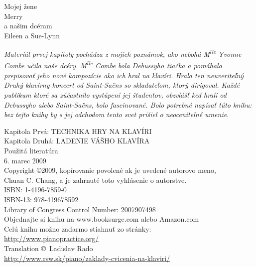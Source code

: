 \begin{center}
Mojej žene\\
\vspace*{1em}
{\large Merry}\\
\vspace*{1em}
a našim dcéram\\
\vspace*{1em}
{\large Eileen a Sue-Lynn}\\	
\vspace*{6em}
\end{center}
\textit{Materiál prvej kapitoly pochádza z mojich poznámok, ako nebohá M\textsuperscript{lle} Yvonne Combe učila naše dcéry. M\textsuperscript{lle} Combe bola Debussyho žiačka a pomáhala prepisovať jeho nové kompozície ako ich hral na klavíri. Hrala ten neuveriteľný Druhý klavírny koncert od Saint-Saëns so skladateľom, ktorý dirigoval. Každé publikum ktoré sa zúčastnilo vystúpení jej študentov, obzvlášť keď hrali od Debussyho alebo Saint-Saëns, bolo fascinované. Bolo potrebné napísať túto knihu: bez tejto knihy by s jej odchodom tento svet prišiel o neoceniteľné umenie.}
\begin{center}
\vspace*{6em}
Kapitola Prvá: TECHNIKA HRY NA KLAVÍRI\\
\vspace*{1em}
Kapitola Druhá: LADENIE VÁŠHO KLAVÍRA\\
\vspace*{1em}
Použitá literatúra\\
\vspace*{10em}
6. marec 2009\\
Copyright \copyright 2009, kopírovanie povolené ak je uvedené autorovo meno,\\
Chuan C. Chang, a je zahrnuté toto vyhlásenie o autorstve.\\
ISBN: 1-4196-7859-0\\
ISBN-13: 978-419678592\\
Library of Congress Control Number: 2007907498\\
Objednajte si knihu na www.booksurge.com alebo Amazon.com\\
\vspace*{1em}
Celú knihu možno zadarmo stiahnuť zo stránky:\\

\href{http://www.pianopractice.org/}{http://www.pianopractice.org/}\\
Translation \copyright \the\year\ Ladislav Rado\\
\href{http://www.rsw.sk/piano/zaklady-cvicenia-na-klaviri/}{http://www.rsw.sk/piano/zaklady-cvicenia-na-klaviri/}
\end{center}

